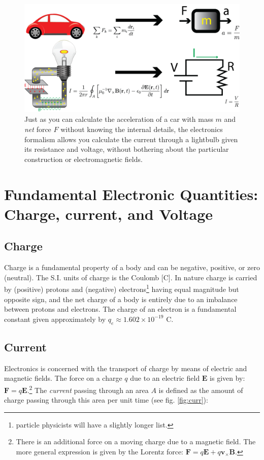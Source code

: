\documentclass{tufte-book}
\begin{document}
\begin{figure}
  \includegraphics{abstraction}
  \caption{Just as you can calculate the acceleration of a car with mass $m$ and \textit{net} force $F$ without knowing the internal details, the electronics formalism allows you calculate the current through a lightbulb given its resistance and voltage, without bothering about the particular construction or electromagnetic fields.}
  \label{fig:abstraction}
\end{figure}


\section{Fundamental Electronic Quantities: Charge, current, and Voltage}
\subsection{Charge} Charge is a fundamental property of a body and can be negative, positive, or zero (neutral). The S.I. units of charge is the Coulomb [C]. In nature charge is carried by (positive) protons and (negative) electrons\footnote{particle physicists will have a slightly longer list.} having equal magnitude but opposite sign, and the net charge of a body is entirely due to an imbalance between protons and electrons. The charge of an electron is a fundamental constant given approximately by $q_e \approx 1.602\times10^{-19}$ C. 

\subsection{Current} Electronics is concerned with the transport of charge by means of electric and magnetic fields. The force on a charge $q$ due to an electric field $\textbf{E}$ is given by: $\textbf{F} = q\textbf{E}$.\footnote{There is an additional force on a moving charge due to a magnetic field. The more general expression is given by the Lorentz force: $\textbf{F} = q\textbf{E} + q\textbf{v}_\times\textbf{B}$.} The \textit{current} passing through an area $A$ is defined as the amount of charge passing through this area per unit time (see fig. \ref{fig:curr}):
\end{document}
